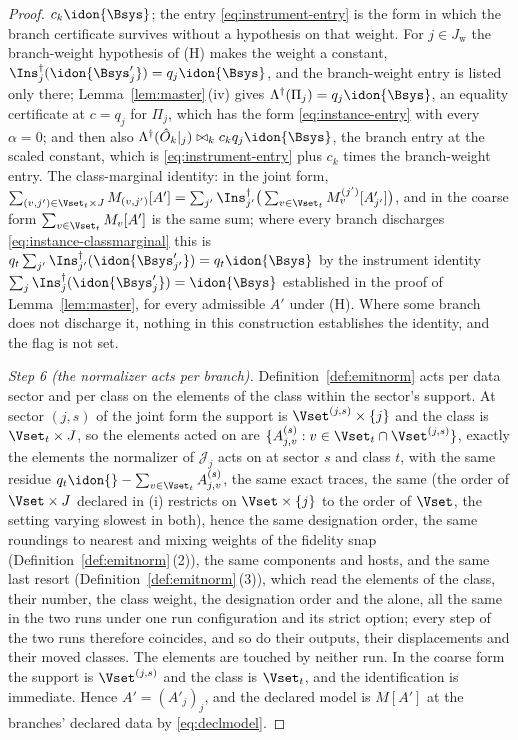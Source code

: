 \begin{proof}
$c_k\idon{\Bsys}$; the entry \eqref{eq:instrument-entry} is the form in
which the branch certificate survives without a hypothesis on that weight.
For $j\in J_{\mathrm{w}}$ the branch-weight hypothesis of (H) makes the
weight a constant, $\Ins_j^{\dagger}(\idon{\Bsys'_j})=q_j\idon{\Bsys}$, and
the branch-weight entry is listed only there; Lemma~\ref{lem:master}\,(iv)
gives
$\Lambda^{\dagger}(\Pi_j)=q_j\idon{\Bsys}$, an equality certificate at
$c=q_j$ for $\Pi_j$, which has the form \eqref{eq:instance-entry} with every
$\alpha=0$; and then also $\Lambda^{\dagger}(\hat O_k|_j)\bowtie_kc_kq_j\idon{\Bsys}$,
the branch entry at the scaled constant, which is
\eqref{eq:instrument-entry} plus $c_k$ times the branch-weight entry.
The class-marginal identity: in the joint form,
$\sum_{(v,j')\in\Vset_t\times J}M_{(v,j')}[A']
=\sum_{j'}\Ins_{j'}^{\dagger}\big(\sum_{v\in\Vset_t}M^{(j')}_v[A'_{j'}]\big)$,
and in the coarse form $\sum_{v\in\Vset_t}M_v[A']$ is the same sum; where
every branch discharges \eqref{eq:instance-classmarginal} this is
$q_t\sum_{j'}\Ins_{j'}^{\dagger}(\idon{\Bsys'_{j'}})=q_t\idon{\Bsys}$ by the
instrument identity $\sum_j\Ins_j^{\dagger}(\idon{\Bsys'_j})=\idon{\Bsys}$
established in the proof of Lemma~\ref{lem:master}, for every admissible
$A'$ under (H). Where some branch does not discharge it, nothing in this
construction establishes the identity, and the flag is not set.

\emph{Step 6 (the normalizer acts per branch).} Definition~\ref{def:emitnorm}
acts per data sector and per class on the elements of the class within the
sector's support. At sector $(j,s)$ of the joint form the support is
$\Vset^{(j,s)}\times\{j\}$ and the class is $\Vset_t\times J$, so the elements
acted on are $\{A^{(s)}_{j,v}:v\in\Vset_t\cap\Vset^{(j,s)}\}$, exactly the
elements the normalizer of $\mathcal{J}_j$ acts on at sector $s$ and class
$t$, with the same residue $q_t\idon{}-\sum_{v\in\Vset_t}A^{(s)}_{j,v}$,
the same exact traces, the same  (the order of
$\Vset\times J$ declared in (i) restricts on $\Vset\times\{j\}$ to the order
of $\Vset$, the setting varying slowest in both), hence the same
designation order, the same roundings to nearest and mixing weights of the fidelity snap
(Definition~\ref{def:emitnorm}\,(2)), the same components and hosts, and the
same last resort (Definition~\ref{def:emitnorm}\,(3)), which read the
elements of the class, their number, the class weight, the designation order
and the  alone, all the same
in the two runs under one run configuration and its strict option; every
step of the two runs therefore coincides, and so do their outputs, their
displacements and their moved classes. The
elements  are touched by neither run. In
the coarse form the support is $\Vset^{(j,s)}$ and the class is $\Vset_t$,
and the identification is immediate. Hence $A'=(A'_j)_j$, and the declared
model is $M[A']$ at the branches' declared data by \eqref{eq:declmodel}.
\end{proof}
